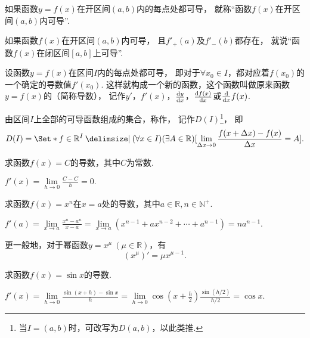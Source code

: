 \begin{definition}
如果函数\(y = f(x)\)在开区间\((a,b)\)内的每点处都可导，
就称“函数\(f(x)\)在开区间\((a,b)\)内可导”.

如果函数\(f(x)\)在开区间\((a,b)\)内可导，
且\(f'_{+}(a)\)及\(f'_{-}(b)\)都存在，
就说“函数\(f(x)\)在闭区间\([a,b]\)上可导”.
\end{definition}

\begin{definition}
设函数\(y = f(x)\)在区间\(I\)内的每点处都可导，
即对于\(\forall x_0 \in I\)，都对应着\(f(x_0)\)的一个确定的导数值\(f'(x_0)\).
这样就构成一个新的函数，这个函数叫做原来函数\(y = f(x)\)的（简称导数），
记作\(y'\)，\(f'(x)\)，\(\dv{y}{x}\)，\(\dv{f(x)}{x}\)或\(\dv{x} f(x)\).
\end{definition}

\begin{definition}\label{definition:函数族.可导函数族}
由区间\(I\)上全部的可导函数组成的集合，称作，
记作\(D(I)\)\footnote{当\(I=(a,b)\)时，可改写为\(D(a,b)\)，以此类推.}，
即\[
	D(I) = \Set*{
		f \in \mathbb{R}^I
		\given
		(\forall x \in I)(\exists A \in \mathbb{R})
		[
			\lim\limits_{\increment x\to0}
			\frac{f(x+\increment x)-f(x)}{\increment x}
			= A
		]
	}.
\]
\end{definition}

\begin{example}
求函数\(f(x) = C\)的导数，其中\(C\)为常数.
\begin{solution}
\(f'(x)
= \lim\limits_{h\to0}\frac{C-C}{h}
= 0.\)
\end{solution}
\end{example}

\begin{example}
求函数\(f(x) = x^n\)在\(x=a\)处的导数，其中\(a\in\mathbb{R},
n\in\mathbb{N}^+\).
\begin{solution}
\(f'(a)
= \lim\limits_{x \to a}\frac{x^n-a^n}{x-a}
= \lim\limits_{x \to a}(x^{n-1}+ax^{n-2}+\dotsb+a^{n-1})
= na^{n-1}.\)
\end{solution}
\end{example}

更一般地，对于幂函数\(y=x^{\mu}\ (\mu\in\mathbb{R})\)，有\begin{equation}
	(x^{\mu})' = \mu x^{\mu-1}.
\end{equation}

\begin{example}
求函数\(f(x) = \sin x\)的导数.
\begin{solution}
\(f'(x) = \lim\limits_{h\to0}\frac{\sin(x+h)-\sin x}{h}
= \lim\limits_{h\to0}{\cos(x+\frac{h}{2}) \frac{\sin(h/2)}{h/2}}
= \cos x.\)
\end{solution}
\end{example}

